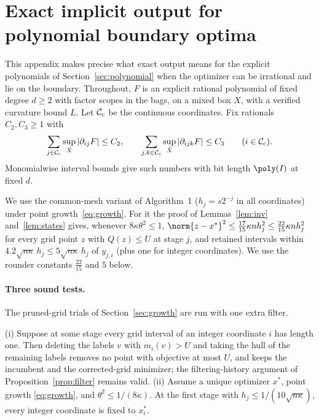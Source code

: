 \section{Exact implicit output for polynomial boundary optima}\label{app:boundary}

This appendix makes precise what exact output means for the explicit
polynomials of Section~\ref{sec:polynomial} when the optimizer can be
irrational and lie on the boundary. Throughout, $F$ is an explicit rational
polynomial of fixed degree $d\ge2$ with factor scopes in the bags, on a mixed
box $X$, with a verified curvature bound $L$. Let $\mathcal C_{\rm c}$ be the
continuous coordinates. Fix rationals $C_2,C_3\ge1$ with
\[
\sum_{j\in\mathcal C_{\rm c}}\sup_{\bar X}|\partial_{ij}F|\le C_2,\qquad
\sum_{j,k\in\mathcal C_{\rm c}}\sup_{\bar X}|\partial_{ijk}F|\le C_3
\qquad(i\in\mathcal C_{\rm c}).
\]
Monomialwise interval bounds give such numbers with bit length $\poly(I)$
at fixed $d$.

We use the common-mesh variant of Algorithm~1 ($h_j=s2^{-j}$ in all
coordinates) under point growth~\eqref{eq:growth}. For it the proof of
Lemmas~\ref{lem:inv} and~\ref{lem:states} gives, whenever $8\kappa\theta^2\le1$,
$\norm{z-x^*}^2\le\frac{17}{15}\kappa nh_j^2\le\frac{22}{15}\kappa nh_j^2$ for every
grid point $z$ with $Q(z)\le U$ at stage $j$, and retained intervals within
$4.2\sqrt{n\kappa}\,h_j\le5\sqrt{n\kappa}\,h_j$ of $y_{j,i}$ (plus one for integer
coordinates). We use the rounder constants $\frac{22}{15}$ and $5$ below.


\paragraph{Three sound tests.}
The pruned-grid trials of Section~\ref{sec:growth} are run with one extra filter.

\begin{lemma}\label{lem:labelfilter}
(i) Suppose at some stage every grid interval of an integer coordinate $i$
has length one. Then deleting the labels $v$ with $m_i(v)>U$ and taking the
hull of the remaining labels removes no point with objective at most $U$, and
keeps the incumbent and the corrected-grid minimizer; the filtering-history
argument of Proposition~\ref{prop:filter} remains valid.
(ii) Assume a unique optimizer $x^*$, point growth \eqref{eq:growth}, and
$\theta^2\le1/(8\kappa)$. At the first stage with
$h_j\le1/(10\sqrt{n\kappa})$, every integer coordinate is fixed to $x^*_i$.
\end{lemma}

